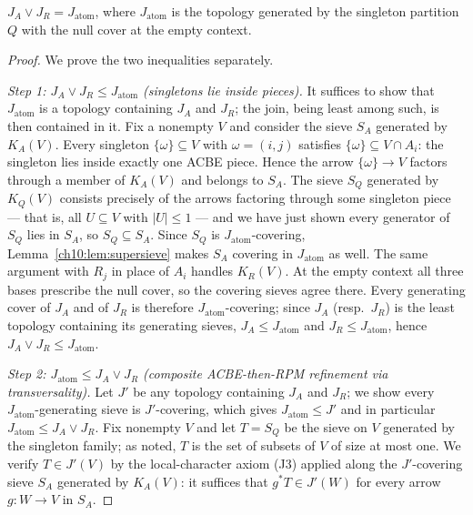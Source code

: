 \begin{lemma}
\label{ch10:lem:join}
$J_A \vee J_R = J_{\mathrm{atom}}$, where $J_{\mathrm{atom}}$ is the topology
generated by the singleton partition $Q$ with the null cover at the empty
context.
\end{lemma}

\begin{proof}
We prove the two inequalities separately.

\emph{Step 1: $J_A \vee J_R \le J_{\mathrm{atom}}$ (singletons lie inside
pieces).} It suffices to show that $J_{\mathrm{atom}}$ is a topology
containing $J_A$ and $J_R$; the join, being least among such, is then
contained in it. Fix a nonempty $V$ and consider the sieve $S_A$ generated by
$K_A(V)$. Every singleton $\{\omega\} \subseteq V$ with
$\omega = (i, j)$ satisfies $\{\omega\} \subseteq V \cap A_i$: the singleton
lies inside exactly one ACBE piece. Hence the arrow $\{\omega\} \to V$
factors through a member of $K_A(V)$ and belongs to $S_A$. The sieve $S_Q$
generated by $K_Q(V)$ consists precisely of the arrows factoring through some
singleton piece --- that is, all $U \subseteq V$ with $|U| \le 1$ --- and we
have just shown every generator of $S_Q$ lies in $S_A$, so
$S_Q \subseteq S_A$. Since $S_Q$ is $J_{\mathrm{atom}}$-covering,
Lemma~\ref{ch10:lem:supersieve} makes $S_A$ covering in $J_{\mathrm{atom}}$
as well. The same argument with $R_j$ in place of $A_i$ handles $K_R(V)$. At
the empty context all three bases prescribe the null cover, so the covering
sieves agree there. Every generating cover of $J_A$ and of $J_R$ is therefore
$J_{\mathrm{atom}}$-covering; since $J_A$ (resp.\ $J_R$) is the least
topology containing its generating sieves, $J_A \le J_{\mathrm{atom}}$ and
$J_R \le J_{\mathrm{atom}}$, hence $J_A \vee J_R \le J_{\mathrm{atom}}$.

\emph{Step 2: $J_{\mathrm{atom}} \le J_A \vee J_R$ (composite ACBE-then-RPM
refinement via transversality).} Let $J'$ be any topology containing $J_A$
and $J_R$; we show every $J_{\mathrm{atom}}$-generating sieve is
$J'$-covering, which gives $J_{\mathrm{atom}} \le J'$ and in particular
$J_{\mathrm{atom}} \le J_A \vee J_R$. Fix nonempty $V$ and let
$T = S_Q$ be the sieve on $V$ generated by the singleton family; as noted, $T$
is the set of subsets of $V$ of size at most one. We verify $T \in J'(V)$ by
the local-character axiom (J3) applied along the $J'$-covering sieve $S_A$
generated by $K_A(V)$: it suffices that $g^{*}T \in J'(W)$ for every arrow
$g : W \to V$ in $S_A$.


\end{proof}
